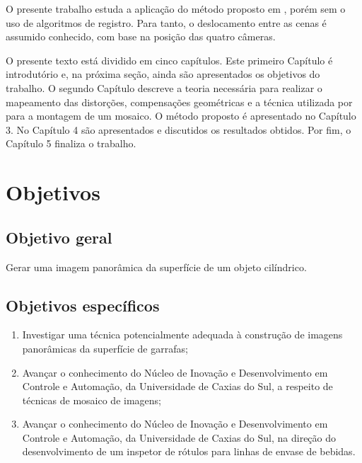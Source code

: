     O presente trabalho estuda a aplicação do método proposto em \cite{Lin:2013}, porém sem o uso de algoritmos de registro. Para tanto, o deslocamento entre as cenas é assumido conhecido, com base na posição das quatro câmeras. 
    
    O presente texto está dividido em cinco capítulos. Este primeiro Capítulo é introdutório e, na próxima seção, ainda são apresentados os objetivos do trabalho. O segundo Capítulo descreve a teoria necessária para realizar o mapeamento das distorções, compensações geométricas e a técnica utilizada por \cite{Lin:2013} para a montagem de um mosaico. O método proposto é apresentado no Capítulo 3. No Capítulo 4 são apresentados e discutidos os resultados obtidos. Por fim, o Capítulo 5 finaliza o trabalho.

	\section{Objetivos}
	
	\subsection*{Objetivo geral}
        Gerar uma imagem panorâmica da superfície de um objeto cilíndrico.
	\subsection*{Objetivos específicos} \label{sec:objetivos:especificos}
	\begin{enumerate}
		\item Investigar uma técnica potencialmente adequada à construção de imagens panorâmicas da superfície de garrafas;
		\item Avançar o conhecimento do Núcleo de Inovação e Desenvolvimento em Controle e Automação, da Universidade de Caxias do Sul, a respeito de técnicas de mosaico de imagens;
		\item Avançar o conhecimento do Núcleo de Inovação e Desenvolvimento em Controle e Automação, da Universidade de Caxias do Sul, na direção do desenvolvimento de um inspetor de rótulos para linhas de envase de bebidas.
	\end{enumerate}
